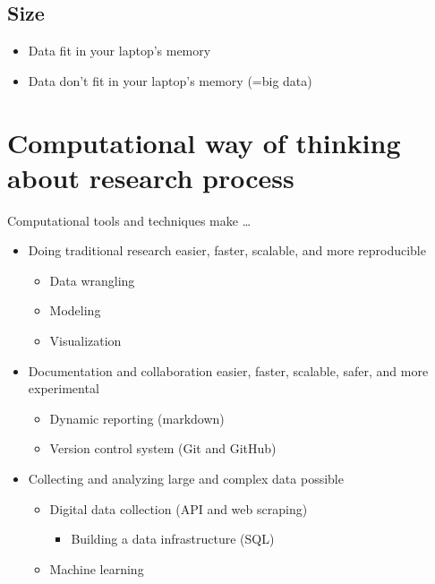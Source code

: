 \documentclass[
]{book}
\providecommand{\tightlist}{%
  \setlength{\itemsep}{0pt}\setlength{\parskip}{0pt}}
\begin{document}
\hypertarget{size}{%
\subsection{Size}\label{size}}

\begin{itemize}
\tightlist
\item
  Data fit in your laptop's memory
\item
  Data don't fit in your laptop's memory (=big data)
\end{itemize}

\hypertarget{computational-way-of-thinking-about-research-process}{%
\section{Computational way of thinking about research process}\label{computational-way-of-thinking-about-research-process}}

Computational tools and techniques make \ldots{}

\begin{itemize}
\tightlist
\item
  Doing traditional research easier, faster, scalable, and more reproducible

  \begin{itemize}
  \tightlist
  \item
    Data wrangling
  \item
    Modeling
  \item
    Visualization
  \end{itemize}
\item
  Documentation and collaboration easier, faster, scalable, safer, and more experimental

  \begin{itemize}
  \tightlist
  \item
    Dynamic reporting (markdown)
  \item
    Version control system (Git and GitHub)
  \end{itemize}
\item
  Collecting and analyzing large and complex data possible

  \begin{itemize}
  \tightlist
  \item
    Digital data collection (API and web scraping)

    \begin{itemize}
    \tightlist
    \item
      Building a data infrastructure (SQL)
    \end{itemize}
  \item
    Machine learning
  \end{itemize}
\end{itemize}
\end{document}
